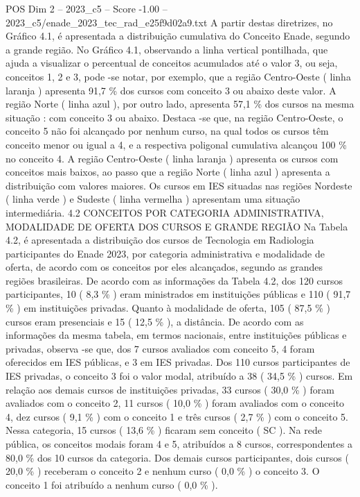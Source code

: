 \begin{textsample}{POS Dim 2 – 2023\_c5 – Score -1.00 – 2023\_c5/enade\_2023\_tec\_rad\_e25f9d02a9.txt}
A partir destas diretrizes, no Gráfico 4.1, é apresentada a distribuição cumulativa do Conceito Enade, segundo a grande região.
No Gráfico 4.1, observando a linha vertical pontilhada, que ajuda a visualizar o percentual de conceitos acumulados até o valor 3, ou seja, conceitos 1, 2 e 3, pode -se notar, por exemplo, que a região Centro-Oeste ( linha laranja ) apresenta 91,7 \% dos cursos com conceito 3 ou abaixo deste valor.
A região Norte ( linha azul ), por outro lado, apresenta 57,1 \% dos cursos na mesma situação : com conceito 3 ou abaixo.
Destaca -se que, na região Centro-Oeste, o conceito 5 não foi alcançado por nenhum curso, na qual todos os cursos têm conceito menor ou igual a 4, e a respectiva poligonal cumulativa alcançou 100 \% no conceito 4.
A região Centro-Oeste ( linha laranja ) apresenta os cursos com conceitos mais baixos, ao passo que a região Norte ( linha azul ) apresenta a distribuição com valores maiores.
Os cursos em IES situadas nas regiões Nordeste ( linha verde ) e Sudeste ( linha vermelha ) apresentam uma situação intermediária. 4.2 CONCEITOS POR CATEGORIA ADMINISTRATIVA, MODALIDADE DE OFERTA DOS CURSOS E GRANDE REGIÃO Na Tabela 4.2, é apresentada a distribuição dos cursos de Tecnologia em Radiologia participantes do Enade 2023, por categoria administrativa e modalidade de oferta, de acordo com os conceitos por eles alcançados, segundo as grandes regiões brasileiras.
De acordo com as informações da Tabela 4.2, dos 120 cursos participantes, 10 ( 8,3 \% ) eram ministrados em instituições públicas e 110 ( 91,7 \% ) em instituições privadas.
Quanto à modalidade de oferta, 105 ( 87,5 \% ) cursos eram presenciais e 15 ( 12,5 \% ), a distância.
De acordo com as informações da mesma tabela, em termos nacionais, entre instituições públicas e privadas, observa -se que, dos 7 cursos avaliados com conceito 5, 4 foram oferecidos em IES públicas, e 3 em IES privadas.
Dos 110 cursos participantes de IES privadas, o conceito 3 foi o valor modal, atribuído a 38 ( 34,5 \% ) cursos.
Em relação aos demais cursos de instituições privadas, 33 cursos ( 30,0 \% ) foram avaliados com o conceito 2, 11 cursos ( 10,0 \% ) foram avaliados com o conceito 4, dez cursos ( 9,1 \% ) com o conceito 1 e três cursos ( 2,7 \% ) com o conceito 5.
Nessa categoria, 15 cursos ( 13,6 \% ) ficaram sem conceito ( SC ).
Na rede pública, os conceitos modais foram 4 e 5, atribuídos a 8 cursos, correspondentes a 80,0 \% dos 10 cursos da categoria.
Dos demais cursos participantes, dois cursos ( 20,0 \% ) receberam o conceito 2 e nenhum curso ( 0,0 \% ) o conceito 3.
O conceito 1 foi atribuído a nenhum curso ( 0,0 \% ).

\end{textsample}
